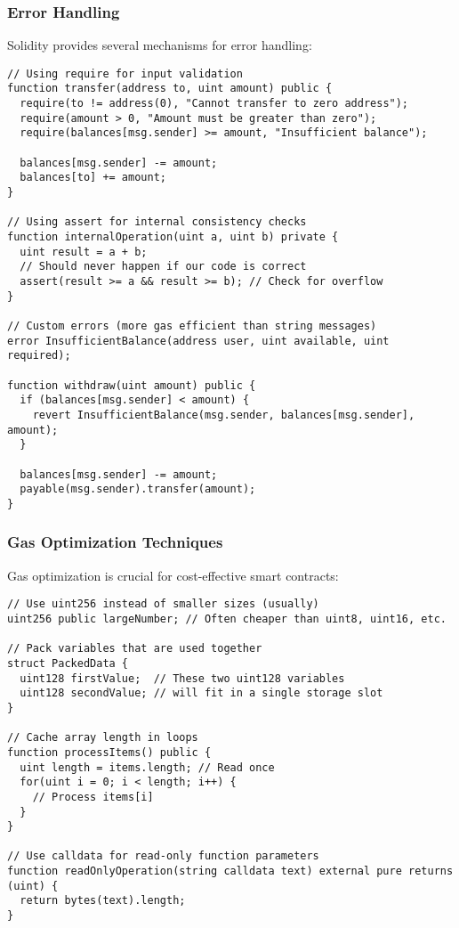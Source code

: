 \documentclass[12pt]{article}
\begin{document}
\noindent
\begin{minipage}[c]{\textwidth}
  \subsubsection*{Error Handling}
  Solidity provides several mechanisms for error handling:

  \begin{lstlisting}[language=Solidity]
// Using require for input validation
function transfer(address to, uint amount) public {
  require(to != address(0), "Cannot transfer to zero address");
  require(amount > 0, "Amount must be greater than zero");
  require(balances[msg.sender] >= amount, "Insufficient balance");
  
  balances[msg.sender] -= amount;
  balances[to] += amount;
}

// Using assert for internal consistency checks
function internalOperation(uint a, uint b) private {
  uint result = a + b;
  // Should never happen if our code is correct
  assert(result >= a && result >= b); // Check for overflow
}

// Custom errors (more gas efficient than string messages)
error InsufficientBalance(address user, uint available, uint required);

function withdraw(uint amount) public {
  if (balances[msg.sender] < amount) {
    revert InsufficientBalance(msg.sender, balances[msg.sender], amount);
  }
  
  balances[msg.sender] -= amount;
  payable(msg.sender).transfer(amount);
}
\end{lstlisting}
\end{minipage}

\subsubsection*{Gas Optimization Techniques}
Gas optimization is crucial for cost-effective smart contracts:

\noindent
\begin{minipage}[c]{\textwidth}
  \begin{lstlisting}[language=Solidity]
// Use uint256 instead of smaller sizes (usually)
uint256 public largeNumber; // Often cheaper than uint8, uint16, etc.

// Pack variables that are used together
struct PackedData {
  uint128 firstValue;  // These two uint128 variables
  uint128 secondValue; // will fit in a single storage slot
}

// Cache array length in loops
function processItems() public {
  uint length = items.length; // Read once
  for(uint i = 0; i < length; i++) {
    // Process items[i]
  }
}

// Use calldata for read-only function parameters
function readOnlyOperation(string calldata text) external pure returns (uint) {
  return bytes(text).length;
}
\end{lstlisting}
\end{minipage}
\end{document}
